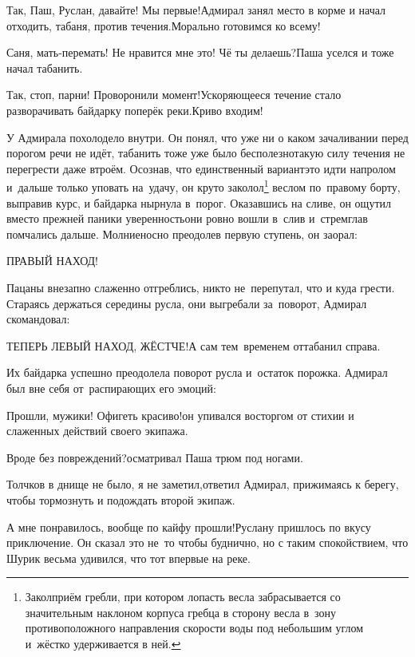 \diagdash Так, Паш, Руслан, давайте! Мы первые!\mdash Адмирал занял место в корме и начал отходить, табаня, против течения.\mdash Морально готовимся ко всему!

\diagdash Саня, мать-перемать! Не нравится мне это! Чё ты делаешь?\mdash Паша уселся и тоже начал табанить.

\diagdash Так, стоп, парни! Проворонили момент!\mdash Ускоряющееся течение стало разворачивать байдарку поперёк реки.\mdash Криво входим! 

\renewcommand*{\thefootnote}{\fnsymbol{footnote}}
\setcounter{footnote}{0}

У Адмирала похолодело внутри. Он понял, что уже ни о каком зачаливании перед порогом речи не идёт, табанить тоже уже было бесполезно\mdash такую силу течения не перегрести даже втроём. Осознав, что единственный вариант\mdash это идти напролом и~дальше только уповать на~удачу, он круто заколол\footnote{Закол\mdash приём гребли, при котором лопасть весла забрасывается со значительным наклоном корпуса гребца в сторону весла в~зону противоположного направления скорости воды под небольшим углом и~жёстко удерживается в ней.} веслом по~правому борту, выправив курс, и байдарка нырнула в~порог. Оказавшись на сливе, он ощутил вместо прежней паники уверенность\mdash они ровно вошли в~слив и~стремглав помчались дальше. Молниеносно преодолев первую ступень, он заорал:

\diagdash ПРАВЫЙ НАХОД!

Пацаны внезапно слаженно отгреблись, никто не~перепутал, что и куда грести. Стараясь держаться середины русла, они выгребали за~поворот, Адмирал скомандовал:

\diagdash ТЕПЕРЬ ЛЕВЫЙ НАХОД, ЖЁСТЧЕ!\mdash А сам тем~временем оттабанил справа. 

Их байдарка успешно преодолела поворот русла и~остаток порожка. Адмирал был вне себя от~распирающих его эмоций:

\diagdash Прошли, мужики! Офигеть красиво!\mdash он упивался восторгом от стихии и слаженных действий своего экипажа.

\diagdash Вроде без повреждений?\mdash осматривал Паша трюм под ногами.

\diagdash Толчков в днище не было, я не заметил,\mdash ответил Адмирал, прижимаясь к берегу, чтобы тормознуть и подождать второй экипаж.

\diagdash А мне понравилось, вообще по кайфу прошли!\mdash Руслану пришлось по вкусу приключение. Он сказал это не~то чтобы буднично, но с таким спокойствием, что Шурик весьма удивился, что тот впервые на реке.

